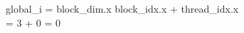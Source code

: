 \documentclass[preview]{standalone}
\begin{document}
\begin{center}
global\_i = block\_dim.x \cdot block\_idx.x + thread\_idx.x\\= 3  + 0 = 0
\end{center}
\end{document}
